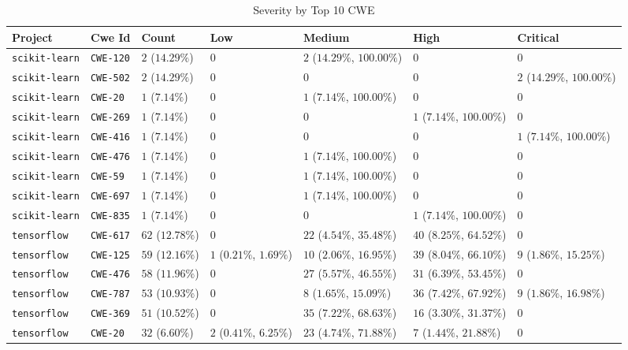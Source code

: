 \begin{table}
\caption{Severity by Top 10 CWE}
\label{tab:cwe-distribution}
\begin{tabular}{lllllll}
\toprule
Project & Cwe Id & Count & Low & Medium & High & Critical \\
\midrule
\texttt{scikit-learn} & \texttt{CWE-120} & $2$ ($14.29\%$) & $0$ & $2$ ($14.29\%$, $100.00\%$) & $0$ & $0$ \\
\texttt{scikit-learn} & \texttt{CWE-502} & $2$ ($14.29\%$) & $0$ & $0$ & $0$ & $2$ ($14.29\%$, $100.00\%$) \\
\texttt{scikit-learn} & \texttt{CWE-20} & $1$ ($7.14\%$) & $0$ & $1$ ($7.14\%$, $100.00\%$) & $0$ & $0$ \\
\texttt{scikit-learn} & \texttt{CWE-269} & $1$ ($7.14\%$) & $0$ & $0$ & $1$ ($7.14\%$, $100.00\%$) & $0$ \\
\texttt{scikit-learn} & \texttt{CWE-416} & $1$ ($7.14\%$) & $0$ & $0$ & $0$ & $1$ ($7.14\%$, $100.00\%$) \\
\texttt{scikit-learn} & \texttt{CWE-476} & $1$ ($7.14\%$) & $0$ & $1$ ($7.14\%$, $100.00\%$) & $0$ & $0$ \\
\texttt{scikit-learn} & \texttt{CWE-59} & $1$ ($7.14\%$) & $0$ & $1$ ($7.14\%$, $100.00\%$) & $0$ & $0$ \\
\texttt{scikit-learn} & \texttt{CWE-697} & $1$ ($7.14\%$) & $0$ & $1$ ($7.14\%$, $100.00\%$) & $0$ & $0$ \\
\texttt{scikit-learn} & \texttt{CWE-835} & $1$ ($7.14\%$) & $0$ & $0$ & $1$ ($7.14\%$, $100.00\%$) & $0$ \\
\texttt{tensorflow} & \texttt{CWE-617} & $62$ ($12.78\%$) & $0$ & $22$ ($4.54\%$, $35.48\%$) & $40$ ($8.25\%$, $64.52\%$) & $0$ \\
\texttt{tensorflow} & \texttt{CWE-125} & $59$ ($12.16\%$) & $1$ ($0.21\%$, $1.69\%$) & $10$ ($2.06\%$, $16.95\%$) & $39$ ($8.04\%$, $66.10\%$) & $9$ ($1.86\%$, $15.25\%$) \\
\texttt{tensorflow} & \texttt{CWE-476} & $58$ ($11.96\%$) & $0$ & $27$ ($5.57\%$, $46.55\%$) & $31$ ($6.39\%$, $53.45\%$) & $0$ \\
\texttt{tensorflow} & \texttt{CWE-787} & $53$ ($10.93\%$) & $0$ & $8$ ($1.65\%$, $15.09\%$) & $36$ ($7.42\%$, $67.92\%$) & $9$ ($1.86\%$, $16.98\%$) \\
\texttt{tensorflow} & \texttt{CWE-369} & $51$ ($10.52\%$) & $0$ & $35$ ($7.22\%$, $68.63\%$) & $16$ ($3.30\%$, $31.37\%$) & $0$ \\
\texttt{tensorflow} & \texttt{CWE-20} & $32$ ($6.60\%$) & $2$ ($0.41\%$, $6.25\%$) & $23$ ($4.74\%$, $71.88\%$) & $7$ ($1.44\%$, $21.88\%$) & $0$ \\

\end{tabular}
\end{table}
